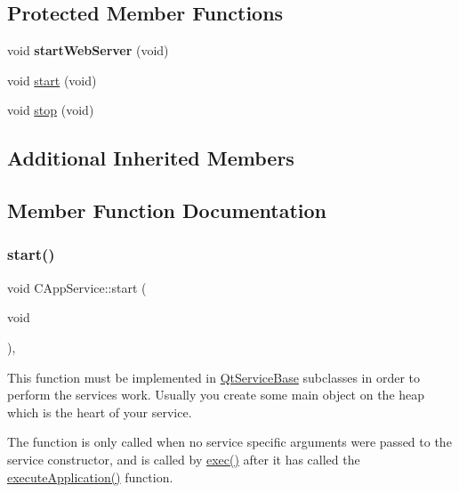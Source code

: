 \subsection*{Protected Member Functions}
\begin{DoxyCompactItemize}
\item 
\mbox{\label{class_c_app_service_af51cc29b9b59833aa5951a34c51ff1ca}} 
void {\bfseries start\+Web\+Server} (void)
\item 
void \hyperlink{class_c_app_service_a9a949fe52710476fa08f64fd6b146e6b}{start} (void)
\item 
void \hyperlink{class_c_app_service_a1090ba3b5428c97b01f7561c5e2bcb74}{stop} (void)
\end{DoxyCompactItemize}
\subsection*{Additional Inherited Members}


\subsection{Member Function Documentation}
\mbox{\label{class_c_app_service_a9a949fe52710476fa08f64fd6b146e6b}} 
\subsubsection{\texorpdfstring{start()}{start()}}
{\footnotesize\ttfamily void C\+App\+Service\+::start (\begin{DoxyParamCaption}\item[{void}]{ }\end{DoxyParamCaption})\hspace{0.3cm}{\ttfamily [protected]}, {\ttfamily [virtual]}}

This function must be implemented in \hyperlink{class_qt_service_base}{Qt\+Service\+Base} subclasses in order to perform the service\textquotesingle{}s work. Usually you create some main object on the heap which is the heart of your service.

The function is only called when no service specific arguments were passed to the service constructor, and is called by \hyperlink{class_qt_service_base_afae2e589de71c1ae3ae8db3dc9ab9c64}{exec()} after it has called the \hyperlink{class_qt_service_a84f5f60304117e1f11cc0ed16dc0b72e}{execute\+Application()} function.

